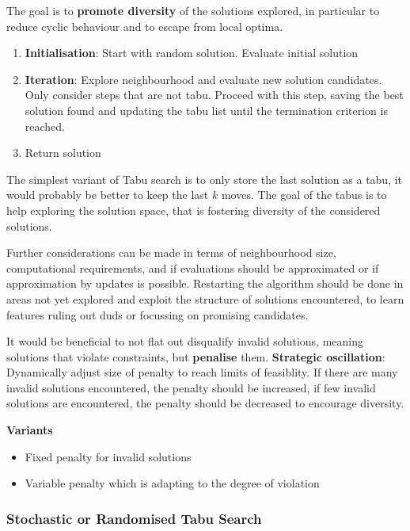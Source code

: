 \documentclass[11pt]{article}
\begin{document}
The goal is to \textbf{promote diversity} of the solutions explored, in particular to reduce cyclic behaviour and to escape from local optima.

\begin{enumerate}
	\item \textbf{Initialisation}: Start with random solution. Evaluate initial solution
	\item \textbf{Iteration}: Explore neighbourhood and evaluate new solution candidates. Only consider steps that are not tabu. Proceed with this step, saving the best solution found and updating the tabu list until the termination criterion is reached.
	\item Return solution
\end{enumerate}

The simplest variant of Tabu search is to only store the last solution as a tabu, it would probably be better to keep the last $k$ moves. The goal of the tabus is to help exploring the solution space, that is fostering diversity of the considered solutions.

Further considerations can be made in terms of neighbourhood size, computational requirements, and if evaluations should be approximated or if approximation by updates is possible. Restarting the algorithm should be done in areas not yet explored and exploit the structure of solutions encountered, to learn features ruling out duds or focussing on promising candidates.

It would be beneficial to not flat out disqualify invalid solutions, meaning solutions that violate constraints, but \textbf{penalise} them. \textbf{Strategic oscillation}: Dynamically adjust size of penalty to reach limits of feasiblity. If there are many invalid solutions encountered, the penalty should be increased, if few invalid solutions are encountered, the penalty should be decreased to encourage diversity.

\noindent
\textbf{Variants}
\begin{itemize}
	\item Fixed penalty for invalid solutions
	\item Variable penalty which is adapting to the degree of violation
\end{itemize}

\subsubsection{Stochastic or Randomised Tabu Search}
\end{document}
